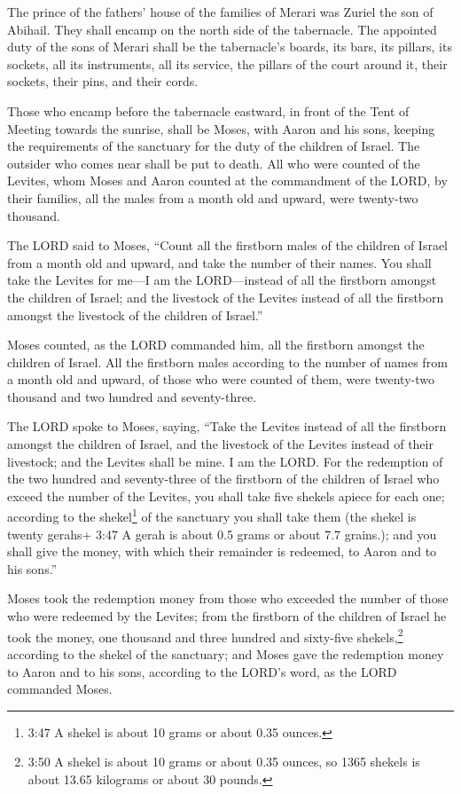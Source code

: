  The prince of the fathers' house of the families of Merari
was Zuriel the son of Abihail. They shall encamp on the north side of
the tabernacle.  The appointed duty of the sons of Merari
shall be the tabernacle's boards, its bars, its pillars, its sockets,
all its instruments, all its service,  the pillars of the
court around it, their sockets, their pins, and their cords.

 Those who encamp before the tabernacle eastward, in front
of the Tent of Meeting towards the sunrise, shall be Moses, with Aaron
and his sons, keeping the requirements of the sanctuary for the duty of
the children of Israel. The outsider who comes near shall be put to
death.  All who were counted of the Levites, whom Moses and
Aaron counted at the commandment of the LORD, by their families, all the
males from a month old and upward, were twenty-two thousand.

 The LORD said to Moses, ``Count all the firstborn males of
the children of Israel from a month old and upward, and take the number
of their names.  You shall take the Levites for me---I am
the LORD---instead of all the firstborn amongst the children of Israel;
and the livestock of the Levites instead of all the firstborn amongst
the livestock of the children of Israel.''

 Moses counted, as the LORD commanded him, all the
firstborn amongst the children of Israel.  All the
firstborn males according to the number of names from a month old and
upward, of those who were counted of them, were twenty-two thousand and
two hundred and seventy-three.

 The LORD spoke to Moses, saying,  ``Take the
Levites instead of all the firstborn amongst the children of Israel, and
the livestock of the Levites instead of their livestock; and the Levites
shall be mine. I am the LORD.  For the redemption of the
two hundred and seventy-three of the firstborn of the children of Israel
who exceed the number of the Levites,  you shall take five
shekels apiece for each one; according to the shekel\footnote{3:47 A
  shekel is about 10 grams or about 0.35 ounces.} of the sanctuary you
shall take them (the shekel is twenty gerahs+ 3:47 A gerah is about 0.5
grams or about 7.7 grains.);  and you shall give the money,
with which their remainder is redeemed, to Aaron and to his sons.''

 Moses took the redemption money from those who exceeded
the number of those who were redeemed by the Levites;  from
the firstborn of the children of Israel he took the money, one thousand
and three hundred and sixty-five shekels,\footnote{3:50 A shekel is
  about 10 grams or about 0.35 ounces, so 1365 shekels is about 13.65
  kilograms or about 30 pounds.} according to the shekel of the
sanctuary;  and Moses gave the redemption money to Aaron
and to his sons, according to the LORD's word, as the LORD commanded
Moses.

